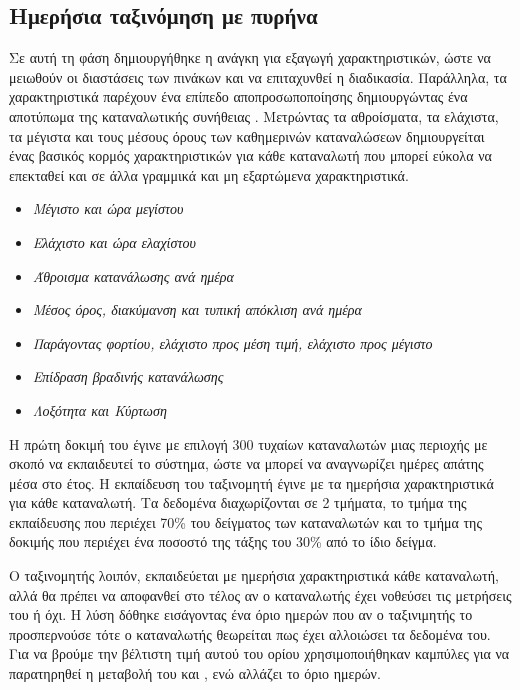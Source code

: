 \subsection{Ημερήσια ταξινόμηση με πυρήνα }
\label{sec:RBFkernel}
Σε αυτή τη φάση δημιουργήθηκε η ανάγκη για εξαγωγή χαρακτηριστικών, ώστε να μειωθούν οι διαστάσεις των πινάκων και να επιταχυνθεί η διαδικασία. Παράλληλα, τα χαρακτηριστικά παρέχουν ένα επίπεδο αποπροσωποποίησης δημιουργώντας ένα αποτύπωμα της καταναλωτικής συνήθειας \cite{giwrgis}. Μετρώντας τα αθροίσματα, τα ελάχιστα, τα μέγιστα και τους μέσους όρους των καθημερινών καταναλώσεων δημιουργείται ένας βασικός κορμός χαρακτηριστικών για κάθε καταναλωτή που μπορεί εύκολα να επεκταθεί και σε άλλα γραμμικά και μη εξαρτώμενα χαρακτηριστικά.
\begin{itemize}
\item \textit{Μέγιστο και ώρα μεγίστου}
\item \textit{Ελάχιστο και ώρα ελαχίστου}
\item \textit{Άθροισμα κατανάλωσης ανά ημέρα}
\item \textit{Μέσος όρος, διακύμανση και τυπική απόκλιση ανά ημέρα}
\item \textit{Παράγοντας φορτίου, ελάχιστο προς μέση τιμή, ελάχιστο προς μέγιστο}
\item \textit{Επίδραση βραδινής κατανάλωσης}
\item \textit{Λοξότητα και Κύρτωση}
\end{itemize}
\par Η πρώτη δοκιμή του  έγινε με επιλογή 300 τυχαίων καταναλωτών μιας περιοχής με σκοπό να εκπαιδευτεί το σύστημα, ώστε να μπορεί να αναγνωρίζει ημέρες απάτης μέσα στο έτος. Η εκπαίδευση του ταξινομητή έγινε με τα ημερήσια χαρακτηριστικά για κάθε καταναλωτή. Τα δεδομένα διαχωρίζονται σε 2 τμήματα, το τμήμα της εκπαίδευσης που περιέχει 70\% του δείγματος των καταναλωτών και το τμήμα της δοκιμής που περιέχει ένα ποσοστό της τάξης του 30\% από το ίδιο δείγμα.\par
Ο ταξινομητής λοιπόν, εκπαιδεύεται με ημερήσια χαρακτηριστικά κάθε καταναλωτή, αλλά θα πρέπει να αποφανθεί στο τέλος αν ο καταναλωτής έχει νοθεύσει τις μετρήσεις του ή όχι. Η λύση δόθηκε εισάγοντας ένα όριο ημερών που αν ο ταξινιμητής το προσπερνούσε τότε ο καταναλωτής θεωρείται πως έχει αλλοιώσει τα δεδομένα του. Για να βρούμε την βέλτιστη τιμή αυτού του ορίου χρησιμοποιήθηκαν  καμπύλες για να παρατηρηθεί η μεταβολή του  και , ενώ αλλάζει το όριο ημερών.\\
